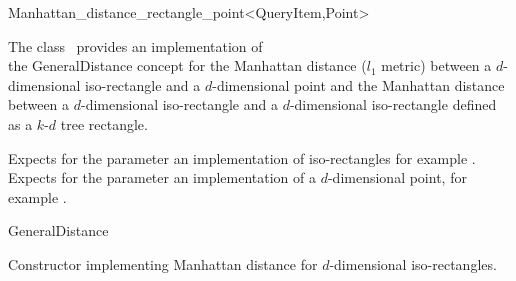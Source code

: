 

\begin{ccRefClass}{Manhattan_distance_rectangle_point<QueryItem,Point>}  %


\ccDefinition
  
The class \ccRefName\ provides an implementation of \\
the GeneralDistance concept
for the Manhattan distance ($l_1$ metric)
between a $d$-dimensional iso-rectangle and a $d$-dimensional point 
and the Manhattan distance between a $d$-dimensional iso-rectangle
and a $d$-dimensional iso-rectangle defined as a $k$-$d$ tree rectangle.


\ccParameters

Expects for the parameter 
 an implementation of iso-rectangles
for example .
Expects for the parameter  an implementation
of a $d$-dimensional point, for example .

\ccIsModel

GeneralDistance

\ccTypes


\ccCreation
{}  %


{Constructor implementing Manhattan distance for
$d$-dimensional iso-rectangles.}

\ccOperations


\end{ccRefClass}
